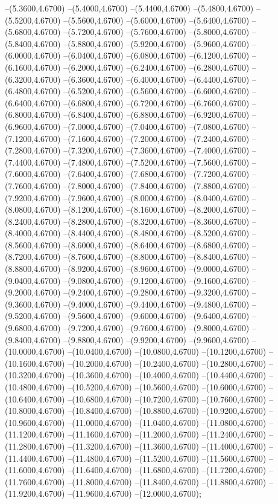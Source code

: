 {	--(5.3600,4.6700)
	--(5.4000,4.6700)
	--(5.4400,4.6700)
	--(5.4800,4.6700)
	--(5.5200,4.6700)
	--(5.5600,4.6700)
	--(5.6000,4.6700)
	--(5.6400,4.6700)
	--(5.6800,4.6700)
	--(5.7200,4.6700)
	--(5.7600,4.6700)
	--(5.8000,4.6700)
	--(5.8400,4.6700)
	--(5.8800,4.6700)
	--(5.9200,4.6700)
	--(5.9600,4.6700)
	--(6.0000,4.6700)
	--(6.0400,4.6700)
	--(6.0800,4.6700)
	--(6.1200,4.6700)
	--(6.1600,4.6700)
	--(6.2000,4.6700)
	--(6.2400,4.6700)
	--(6.2800,4.6700)
	--(6.3200,4.6700)
	--(6.3600,4.6700)
	--(6.4000,4.6700)
	--(6.4400,4.6700)
	--(6.4800,4.6700)
	--(6.5200,4.6700)
	--(6.5600,4.6700)
	--(6.6000,4.6700)
	--(6.6400,4.6700)
	--(6.6800,4.6700)
	--(6.7200,4.6700)
	--(6.7600,4.6700)
	--(6.8000,4.6700)
	--(6.8400,4.6700)
	--(6.8800,4.6700)
	--(6.9200,4.6700)
	--(6.9600,4.6700)
	--(7.0000,4.6700)
	--(7.0400,4.6700)
	--(7.0800,4.6700)
	--(7.1200,4.6700)
	--(7.1600,4.6700)
	--(7.2000,4.6700)
	--(7.2400,4.6700)
	--(7.2800,4.6700)
	--(7.3200,4.6700)
	--(7.3600,4.6700)
	--(7.4000,4.6700)
	--(7.4400,4.6700)
	--(7.4800,4.6700)
	--(7.5200,4.6700)
	--(7.5600,4.6700)
	--(7.6000,4.6700)
	--(7.6400,4.6700)
	--(7.6800,4.6700)
	--(7.7200,4.6700)
	--(7.7600,4.6700)
	--(7.8000,4.6700)
	--(7.8400,4.6700)
	--(7.8800,4.6700)
	--(7.9200,4.6700)
	--(7.9600,4.6700)
	--(8.0000,4.6700)
	--(8.0400,4.6700)
	--(8.0800,4.6700)
	--(8.1200,4.6700)
	--(8.1600,4.6700)
	--(8.2000,4.6700)
	--(8.2400,4.6700)
	--(8.2800,4.6700)
	--(8.3200,4.6700)
	--(8.3600,4.6700)
	--(8.4000,4.6700)
	--(8.4400,4.6700)
	--(8.4800,4.6700)
	--(8.5200,4.6700)
	--(8.5600,4.6700)
	--(8.6000,4.6700)
	--(8.6400,4.6700)
	--(8.6800,4.6700)
	--(8.7200,4.6700)
	--(8.7600,4.6700)
	--(8.8000,4.6700)
	--(8.8400,4.6700)
	--(8.8800,4.6700)
	--(8.9200,4.6700)
	--(8.9600,4.6700)
	--(9.0000,4.6700)
	--(9.0400,4.6700)
	--(9.0800,4.6700)
	--(9.1200,4.6700)
	--(9.1600,4.6700)
	--(9.2000,4.6700)
	--(9.2400,4.6700)
	--(9.2800,4.6700)
	--(9.3200,4.6700)
	--(9.3600,4.6700)
	--(9.4000,4.6700)
	--(9.4400,4.6700)
	--(9.4800,4.6700)
	--(9.5200,4.6700)
	--(9.5600,4.6700)
	--(9.6000,4.6700)
	--(9.6400,4.6700)
	--(9.6800,4.6700)
	--(9.7200,4.6700)
	--(9.7600,4.6700)
	--(9.8000,4.6700)
	--(9.8400,4.6700)
	--(9.8800,4.6700)
	--(9.9200,4.6700)
	--(9.9600,4.6700)
	--(10.0000,4.6700)
	--(10.0400,4.6700)
	--(10.0800,4.6700)
	--(10.1200,4.6700)
	--(10.1600,4.6700)
	--(10.2000,4.6700)
	--(10.2400,4.6700)
	--(10.2800,4.6700)
	--(10.3200,4.6700)
	--(10.3600,4.6700)
	--(10.4000,4.6700)
	--(10.4400,4.6700)
	--(10.4800,4.6700)
	--(10.5200,4.6700)
	--(10.5600,4.6700)
	--(10.6000,4.6700)
	--(10.6400,4.6700)
	--(10.6800,4.6700)
	--(10.7200,4.6700)
	--(10.7600,4.6700)
	--(10.8000,4.6700)
	--(10.8400,4.6700)
	--(10.8800,4.6700)
	--(10.9200,4.6700)
	--(10.9600,4.6700)
	--(11.0000,4.6700)
	--(11.0400,4.6700)
	--(11.0800,4.6700)
	--(11.1200,4.6700)
	--(11.1600,4.6700)
	--(11.2000,4.6700)
	--(11.2400,4.6700)
	--(11.2800,4.6700)
	--(11.3200,4.6700)
	--(11.3600,4.6700)
	--(11.4000,4.6700)
	--(11.4400,4.6700)
	--(11.4800,4.6700)
	--(11.5200,4.6700)
	--(11.5600,4.6700)
	--(11.6000,4.6700)
	--(11.6400,4.6700)
	--(11.6800,4.6700)
	--(11.7200,4.6700)
	--(11.7600,4.6700)
	--(11.8000,4.6700)
	--(11.8400,4.6700)
	--(11.8800,4.6700)
	--(11.9200,4.6700)
	--(11.9600,4.6700)
	--(12.0000,4.6700);
}
